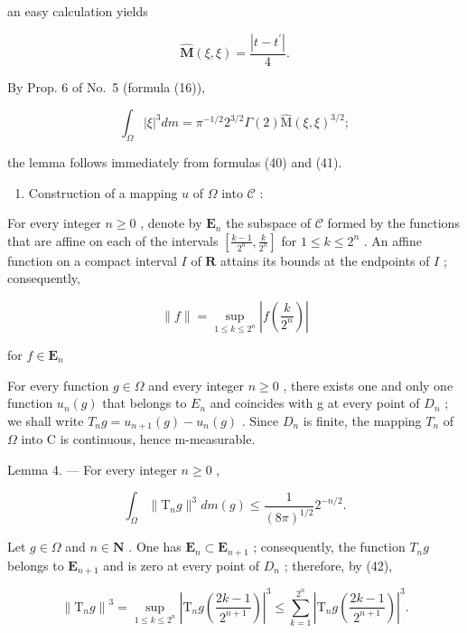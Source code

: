 an easy calculation yields

\[
\widehat {\mathbf {M}} (\xi , \xi) = \frac {| t - t ^ {\prime} |}{4}.\tag{40}
\]

By Prop. 6 of No.~5 (formula (16)),

\[
\int_ {\Omega} | \xi | ^ {3} d m = \pi^ {- 1 / 2} 2 ^ {3 / 2} \Gamma (2) \widehat {\mathrm{M}} (\xi , \xi) ^ {3 / 2};\tag{41}
\]

the lemma follows immediately from formulas (40) and (41).

\begin{enumerate}
\def\labelenumi{\Alph{enumi})}
\setcounter{enumi}{1}
\tightlist
\item
  Construction of a mapping \(u\) of \(\Omega\) into \(\mathcal{C}\) :
\end{enumerate}

For every integer \(n \geqslant 0\) , denote by \(\mathbf{E}_n\) the subspace of \(\mathcal{C}\) formed by the functions that are affine on each of the intervals \(\left[\frac{k - 1}{2^n}, \frac{k}{2^n}\right]\) for \(1 \leqslant k \leqslant 2^n\) . An affine function on a compact interval \(I\) of \(\mathbf{R}\) attains its bounds at the endpoints of \(I\) ; consequently,

\[
\| f \| = \sup _ {1 \leqslant k \leqslant 2 ^ {n}} \left| f \left(\frac {k}{2 ^ {n}}\right) \right|\tag{42}
\]

for \(f\in \mathbf{E}_n\)

For every function \(g \in \Omega\) and every integer \(n \geqslant 0\) , there exists one and only one function \(u_{n}(g)\) that belongs to \(E_{n}\) and coincides with g at every point of \(D_{n}\) ; we shall write \(T_{n}g = u_{n+1}(g) - u_{n}(g)\) . Since \(D_{n}\) is finite, the mapping \(T_{n}\) of \(\Omega\) into C is continuous, hence m-measurable.

Lemma 4. --- For every integer \(n \geqslant 0\) ,

\[
\int_ {\Omega} \| \mathrm{T} _ {n} g \| ^ {3} d m (g) \leqslant \frac {1}{(8 \pi) ^ {1 / 2}} 2 ^ {- n / 2}.\tag{43}
\]

Let \(g \in \Omega\) and \(n \in \mathbf{N}\) . One has \(\mathbf{E}_n \subset \mathbf{E}_{n+1}\) ; consequently, the function \(T_n g\) belongs to \(\mathbf{E}_{n+1}\) and is zero at every point of \(D_n\) ; therefore, by (42),

\[
\left\| \mathrm{T} _ {n} g \right\| ^ {3} = \sup _ {1 \leqslant k \leqslant 2 ^ {n}} \left| \mathrm{T} _ {n} g \left(\frac {2 k - 1}{2 ^ {n + 1}}\right) \right| ^ {3} \leqslant \sum_ {k = 1} ^ {2 ^ {n}} \left| \mathrm{T} _ {n} g \left(\frac {2 k - 1}{2 ^ {n + 1}}\right) \right| ^ {3}.\tag{44}
\]

